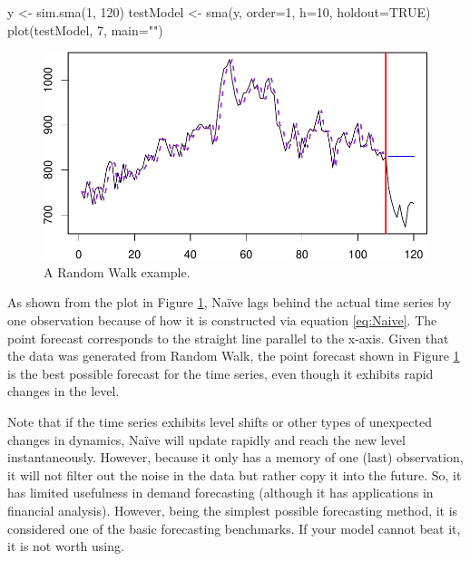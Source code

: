 \documentclass[
]{book}
\newenvironment{Shaded}{\begin{snugshade}}{\end{snugshade}}
\newcommand{\AttributeTok}[1]{\textcolor[rgb]{0.77,0.63,0.00}{#1}}
\newcommand{\ConstantTok}[1]{\textcolor[rgb]{0.00,0.00,0.00}{#1}}
\newcommand{\DecValTok}[1]{\textcolor[rgb]{0.00,0.00,0.81}{#1}}
\newcommand{\FunctionTok}[1]{\textcolor[rgb]{0.00,0.00,0.00}{#1}}
\newcommand{\NormalTok}[1]{#1}
\newcommand{\OtherTok}[1]{\textcolor[rgb]{0.56,0.35,0.01}{#1}}
\newcommand{\StringTok}[1]{\textcolor[rgb]{0.31,0.60,0.02}{#1}}
\theoremstyle{definition}
\theoremstyle{definition}
\theoremstyle{definition}
\theoremstyle{definition}
\theoremstyle{remark}
\begin{document}
\begin{Shaded}
\begin{Highlighting}[]
\NormalTok{y }\OtherTok{\textless{}{-}} \FunctionTok{sim.sma}\NormalTok{(}\DecValTok{1}\NormalTok{, }\DecValTok{120}\NormalTok{)}
\NormalTok{testModel }\OtherTok{\textless{}{-}} \FunctionTok{sma}\NormalTok{(y, }\AttributeTok{order=}\DecValTok{1}\NormalTok{,}
                 \AttributeTok{h=}\DecValTok{10}\NormalTok{, }\AttributeTok{holdout=}\ConstantTok{TRUE}\NormalTok{)}
\FunctionTok{plot}\NormalTok{(testModel, }\DecValTok{7}\NormalTok{, }\AttributeTok{main=}\StringTok{""}\NormalTok{)}
\end{Highlighting}
\end{Shaded}

\begin{figure}
\centering
\includegraphics{Svetunkov--2022----ADAM_files/figure-latex/naiveExample-1.pdf}
\caption{\label{fig:naiveExample}A Random Walk example.}
\end{figure}

As shown from the plot in Figure \ref{fig:naiveExample}, Naïve lags behind the actual time series by one observation because of how it is constructed via equation \eqref{eq:Naive}. The point forecast corresponds to the straight line parallel to the x-axis. Given that the data was generated from Random Walk, the point forecast shown in Figure \ref{fig:naiveExample} is the best possible forecast for the time series, even though it exhibits rapid changes in the level.

Note that if the time series exhibits level shifts or other types of unexpected changes in dynamics, Naïve will update rapidly and reach the new level instantaneously. However, because it only has a memory of one (last) observation, it will not filter out the noise in the data but rather copy it into the future. So, it has limited usefulness in demand forecasting (although it has applications in financial analysis). However, being the simplest possible forecasting method, it is considered one of the basic forecasting benchmarks. If your model cannot beat it, it is not worth using.
\end{document}
